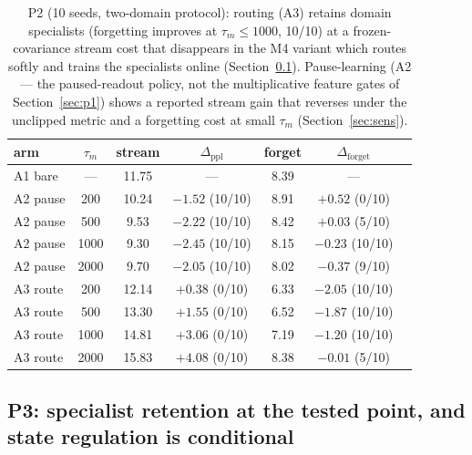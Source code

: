 \documentclass[preprint,12pt]{elsarticle}
\begin{document}
\begin{table}[t]
\centering
\small
\begin{tabular}{lcccccc}
\toprule
arm & $\tau_m$ & stream & $\Delta_{\mathrm{ppl}}$ & forget &
$\Delta_{\mathrm{forget}}$ \\
\midrule
A1 bare & --- & 11.75 & --- & 8.39 & --- \\
A2 pause & 200 & 10.24 & $-1.52$ (10/10) & 8.91 & $+0.52$ (0/10) \\
A2 pause & 500 & 9.53 & $-2.22$ (10/10) & 8.42 & $+0.03$ (5/10) \\
A2 pause & 1000 & 9.30 & $-2.45$ (10/10) & 8.15 & $-0.23$ (10/10) \\
A2 pause & 2000 & 9.70 & $-2.05$ (10/10) & 8.02 & $-0.37$ (9/10) \\
A3 route & 200 & 12.14 & $+0.38$ (0/10) & 6.33 & $-2.05$ (10/10) \\
A3 route & 500 & 13.30 & $+1.55$ (0/10) & 6.52 & $-1.87$ (10/10) \\
A3 route & 1000 & 14.81 & $+3.06$ (0/10) & 7.19 & $-1.20$ (10/10) \\
A3 route & 2000 & 15.83 & $+4.08$ (0/10) & 8.38 & $-0.01$ (5/10) \\
\bottomrule
\end{tabular}
\caption{P2 (10 seeds, two-domain protocol): routing (A3) retains domain
specialists (forgetting improves at $\tau_m \le 1000$, 10/10) at a
frozen-covariance stream cost that disappears in the M4 variant which
routes softly and trains the specialists online
(Section~\ref{sec:p3}). Pause-learning (A2 --- the paused-readout policy,
not the multiplicative feature gates of Section~\ref{sec:p1}) shows a
reported stream gain that reverses under the unclipped metric and a
forgetting cost at small $\tau_m$ (Section~\ref{sec:sens}).}
\label{tab:p2}
\end{table}

\subsection{P3: specialist retention at the tested point, and state
regulation is conditional}
\label{sec:p3}
\end{document}
